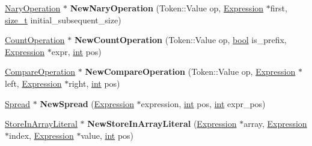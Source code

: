 \begin{DoxyCompactItemize}
\item 
\mbox{\label{classv8_1_1internal_1_1AstNodeFactory_aa29e1131ed37b95ac9e89cef5c3a9658}} 
\mbox{\hyperlink{classv8_1_1internal_1_1NaryOperation}{Nary\+Operation}} $\ast$ {\bfseries New\+Nary\+Operation} (Token\+::\+Value op, \mbox{\hyperlink{classv8_1_1internal_1_1Expression}{Expression}} $\ast$first, \mbox{\hyperlink{classsize__t}{size\+\_\+t}} initial\+\_\+subsequent\+\_\+size)
\item 
\mbox{\label{classv8_1_1internal_1_1AstNodeFactory_a98d5cc982cbbf73b0d0bc47bb58b6266}} 
\mbox{\hyperlink{classv8_1_1internal_1_1CountOperation}{Count\+Operation}} $\ast$ {\bfseries New\+Count\+Operation} (Token\+::\+Value op, \mbox{\hyperlink{classbool}{bool}} is\+\_\+prefix, \mbox{\hyperlink{classv8_1_1internal_1_1Expression}{Expression}} $\ast$expr, \mbox{\hyperlink{classint}{int}} pos)
\item 
\mbox{\label{classv8_1_1internal_1_1AstNodeFactory_a6fb78b60249110fd7d2576a94b8af0ca}} 
\mbox{\hyperlink{classv8_1_1internal_1_1CompareOperation}{Compare\+Operation}} $\ast$ {\bfseries New\+Compare\+Operation} (Token\+::\+Value op, \mbox{\hyperlink{classv8_1_1internal_1_1Expression}{Expression}} $\ast$left, \mbox{\hyperlink{classv8_1_1internal_1_1Expression}{Expression}} $\ast$right, \mbox{\hyperlink{classint}{int}} pos)
\item 
\mbox{\label{classv8_1_1internal_1_1AstNodeFactory_aa93ff631f69ce73eb0688bc4451750ff}} 
\mbox{\hyperlink{classv8_1_1internal_1_1Spread}{Spread}} $\ast$ {\bfseries New\+Spread} (\mbox{\hyperlink{classv8_1_1internal_1_1Expression}{Expression}} $\ast$expression, \mbox{\hyperlink{classint}{int}} pos, \mbox{\hyperlink{classint}{int}} expr\+\_\+pos)
\item 
\mbox{\label{classv8_1_1internal_1_1AstNodeFactory_a37290a522114df9d810d5972493b4a1f}} 
\mbox{\hyperlink{classv8_1_1internal_1_1StoreInArrayLiteral}{Store\+In\+Array\+Literal}} $\ast$ {\bfseries New\+Store\+In\+Array\+Literal} (\mbox{\hyperlink{classv8_1_1internal_1_1Expression}{Expression}} $\ast$array, \mbox{\hyperlink{classv8_1_1internal_1_1Expression}{Expression}} $\ast$index, \mbox{\hyperlink{classv8_1_1internal_1_1Expression}{Expression}} $\ast$value, \mbox{\hyperlink{classint}{int}} pos)

\end{DoxyCompactItemize}
